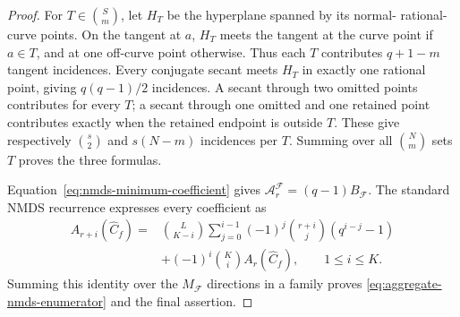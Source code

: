 \begin{proof}
For \(T\in\binom Sm\), let \(H_T\) be the hyperplane spanned by its normal-
rational-curve points.  On the tangent at \(a\), \(H_T\) meets the tangent at
the curve point if \(a\in T\), and at one off-curve point otherwise.  Thus
each \(T\) contributes \(q+1-m\) tangent incidences.  Every conjugate secant
meets \(H_T\) in exactly one rational point, giving \(q(q-1)/2\) incidences.
A secant through two omitted points contributes for every \(T\); a secant
through one omitted and one retained point contributes exactly when the
retained endpoint is outside \(T\).  These give respectively
\(\binom s2\) and \(s(N-m)\) incidences per \(T\).  Summing over all
\(\binom Nm\) sets \(T\) proves the three formulas.

Equation~\eqref{eq:nmds-minimum-coefficient} gives
\(\mathcal A_r^{\mathcal F}=(q-1)B_{\mathcal F}\).  The standard NMDS recurrence
\cite[Thm.~10]{MeneghettiPellegriniSala2020} expresses every coefficient as
\begin{align*}
 A_{r+i}(\widehat C_f)
={}&\binom{L}{K-i}
 \sum_{j=0}^{i-1}(-1)^j\binom{r+i}{j}(q^{i-j}-1)\\
 &+(-1)^i\binom Ki A_r(\widehat C_f),\qquad 1\leq i\leq K.
\end{align*}
Summing this identity over the \(M_{\mathcal F}\) directions in a family proves
\eqref{eq:aggregate-nmds-enumerator} and the final assertion.
\end{proof}
